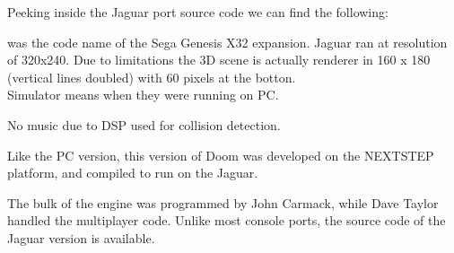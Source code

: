 \par
Peeking inside the Jaguar port source code we can find the following:\\
\par
{}
\par
{} was the code name of the Sega Genesis X32 expansion. Jaguar ran at resolution of 320x240. Due to limitations the 3D scene is actually renderer in 160 x 180 (vertical lines doubled) with 60 pixels at the botton.\\
Simulator means when they were running on PC.
\par
No music due to DSP used for collision detection.\\
\par
Like the PC version, this version of Doom was developed on the NEXTSTEP platform, and compiled to run on the Jaguar.\\
\par The bulk of the engine was programmed by John Carmack, while Dave Taylor handled the multiplayer code. Unlike most console ports, the source code of the Jaguar version is available.\\
\pagebreak